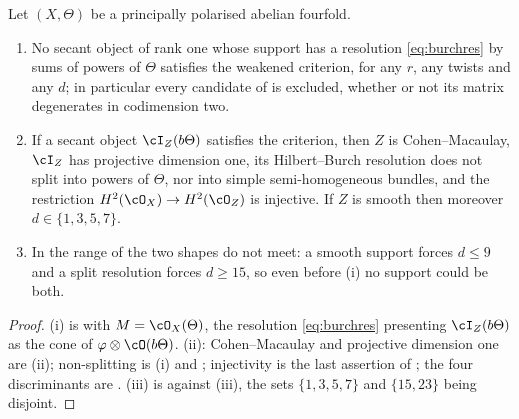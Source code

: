 \begin{corollary}
\label{cor:disjointroutes}
Let $(X,\Theta)$ be a principally polarised abelian fourfold.
\begin{enumerate}[label=\textup{(\roman*)},nosep]
\item No secant object of rank one whose support has a resolution
  \eqref{eq:burchres} by sums of powers of $\Theta$ satisfies the weakened
  criterion, for any $r$, any twists and any $d$; in particular every
  candidate of  is excluded, whether or not its matrix
  degenerates in codimension two.
\item If a secant object $\cI_{Z}(b\Theta)$ satisfies the criterion, then
  $Z$ is Cohen--Macaulay, $\cI_{Z}$ has projective dimension one, its
  Hilbert--Burch resolution does not split into powers of $\Theta$, nor into
  simple semi-homogeneous bundles, and the restriction
  $H^{2}(\cO_{X})\to H^{2}(\cO_{Z})$ is injective. If $Z$ is smooth then
  moreover $d\in\{1,3,5,7\}$.
\item In the range of  the two shapes do not meet:
  a smooth support forces $d\le9$ and a split resolution forces $d\ge15$,
  so even before (i) no support could be both.
\end{enumerate}
\end{corollary}

\begin{proof}
(i) is  with $M=\cO_{X}(\Theta)$, the resolution
\eqref{eq:burchres} presenting $\cI_{Z}(b\Theta)$ as the cone of
$\varphi\otimes\cO(b\Theta)$. (ii): Cohen--Macaulay and projective
dimension one are (ii); non-splitting is (i) and
;
injectivity is the last assertion of ; the four
discriminants are . (iii) is
 against (iii), the sets
$\{1,3,5,7\}$ and $\{15,23\}$ being disjoint.
\end{proof}

